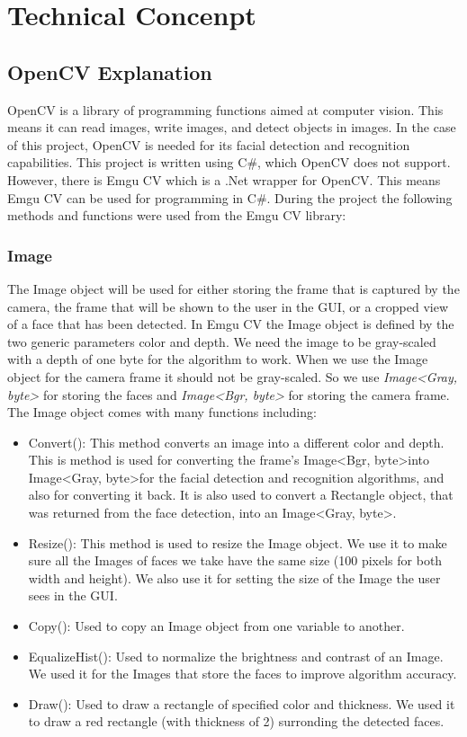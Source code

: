 \documentclass[12pt, a4paper]{article}
\begin{document}
\newpage




\section{Technical Concenpt}
\subsection{OpenCV Explanation}
OpenCV is a library of programming functions aimed at computer vision. This means it can read images, write images, and detect objects in images. In the case of this project, OpenCV is needed for its facial detection and recognition capabilities. This project is written using C\#, which OpenCV does not support. However, there is Emgu CV which is a .Net wrapper for OpenCV. This means Emgu CV can be used for programming in C\#. During the project the following methods and functions were used from the Emgu CV library:
\subsubsection{Image}
The Image object will be used for either storing the frame that is captured by the camera, the frame that will be shown to the user in the GUI, or a cropped view of a face that has been detected.  In Emgu CV the Image object is defined by the two generic parameters color and depth. We need the image to be gray-scaled with a depth of one byte for the algorithm to work. When we use the Image object for the camera frame it should not be gray-scaled. So we use \textit{Image\textless Gray, byte\textgreater} for storing the faces and \textit{Image\textless Bgr, byte\textgreater} for storing the camera frame. The Image object comes with many functions including:
\begin{itemize}
\item Convert(): This method converts an image into a different color and depth. This is method is used for converting the frame’s Image\textless Bgr, byte\textgreater into Image\textless Gray, byte\textgreater for the facial detection and recognition algorithms, and also for converting it back. It is also used to convert a Rectangle object, that was returned from the face detection, into an Image\textless Gray, byte\textgreater.
\item Resize(): This method is used to resize the Image object. We use it to make sure all the Images of faces we take have the same size (100 pixels for both width and height). We also use it for setting the size of the Image the user sees in the GUI.
\item Copy(): Used to copy an Image object from one variable to another.
\item EqualizeHist(): Used to normalize the brightness and contrast of an Image. We used it for the Images that store the faces to improve algorithm accuracy.
\item Draw(): Used to draw a rectangle of specified color and thickness. We used it to draw a red rectangle (with thickness of 2) surronding the detected faces.
\end{itemize}
\end{document}
